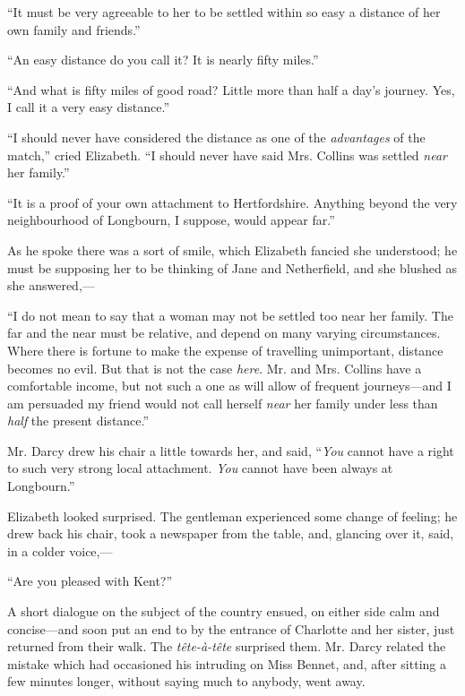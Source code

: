 ``It must be very agreeable to her to be settled within so easy a distance of her own family and friends.''

``An easy distance do you call it? It is nearly fifty miles.''

``And what is fifty miles of good road? Little more than half a day's journey. Yes, I call it a very easy distance.''

``I should never have considered the distance as one of the \textit{advantages} of the match,'' cried Elizabeth. ``I should never have said Mrs. Collins was settled \textit{near} her family.''

``It is a proof of your own attachment to Hertfordshire. Anything beyond the very neighbourhood of Longbourn, I suppose, would appear far.''

As he spoke there was a sort of smile, which Elizabeth fancied she understood; he must be supposing her to be thinking of Jane and Netherfield, and she blushed as she answered,---

``I do not mean to say that a woman may not be settled too near her family. The far and the near must be relative, and depend on many varying circumstances. Where there is fortune to make the expense of travelling unimportant, distance becomes no evil. But that is not the case \textit{here}. Mr. and Mrs. Collins have a comfortable income, but not such a one as will allow of frequent journeys---and I am persuaded my friend would not call herself \textit{near} her family under less than \textit{half} the present distance.''

Mr. Darcy drew his chair a little towards her, and said, ``\textit{You} cannot have a right to such very strong local attachment. \textit{You} cannot have been always at Longbourn.''

Elizabeth looked surprised. The gentleman experienced some change of feeling; he drew back his chair, took a newspaper from the table, and, glancing over it, said, in a colder voice,---

``Are you pleased with Kent?''

A short dialogue on the subject of the country ensued, on either side calm and concise---and soon put an end to by the entrance of Charlotte and her sister, just returned from their walk. The \textit{tête-à-tête} surprised them. Mr. Darcy related the mistake which had occasioned his intruding on Miss Bennet, and, after sitting a few minutes longer, without saying much to anybody, went away.



